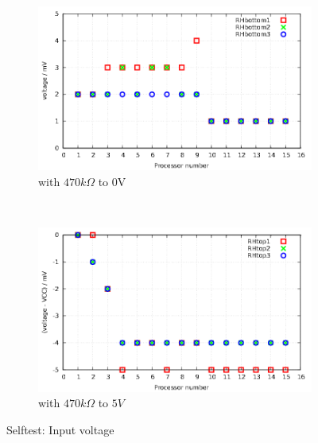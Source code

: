 \begin{figure}[H]
  \begin{subfigure}[b]{.5\textwidth}
  \centering
    \includegraphics[width=1.\textwidth]{../GNU/SelfTbottomH.pdf}
    \caption{with \(470k\Omega\) to 0V}
    \label{fig:SelfTlowH}
  \end{subfigure}
  ~
  \begin{subfigure}[b]{.5\textwidth}
  \centering
    \includegraphics[width=1.\textwidth]{../GNU/SelfTtopH.pdf}
    \caption{with \(470k\Omega\) to \(5V\)}
    \label{fig:SelfTtopH}
  \end{subfigure}
  \caption{Selftest: Input voltage}
\end{figure}

